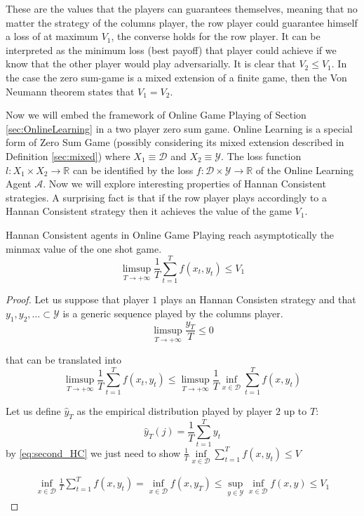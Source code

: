 These are the values that the players can guarantees themselves, meaning that no matter the strategy of the columns player, the row player could guarantee himself a loss of at maximum $V_1$, the converse holds for the row player. It can be interpreted as the minimum loss (best payoff) that player could achieve if we know that the other player would play adversarially. It is clear that $V_2\le V_1$. In the case the zero sum-game is a mixed extension of a finite game, then the Von Neumann theorem states that $V_1=V_2$.
 
Now we will embed the framework of Online Game Playing of Section \ref{sec:OnlineLearning} in a two player zero sum game. 
Online Learning is a special form of Zero Sum Game (possibly considering its mixed extension described in Definition \ref{sec:mixed}) where $X_1\equiv \mathcal D$ and $X_2\equiv \mathcal Y$. The loss function $l:X_1\times X_2\to\mathbb R$ can be identified by the loss $f:\mathcal D\times \mathcal Y\to\mathbb R$ of the Online Learning Agent $\mathcal A$.
Now we will explore interesting properties of Hannan Consistent strategies. A surprising fact is that if the row player plays accordingly to a Hannan Consistent strategy then it achieves the value of the game $V_1$. 

\begin{theorem}
    Hannan Consistent agents in Online Game Playing reach asymptotically the minmax value of the one shot game.
    $$\limsup\limits_{T\to +\infty}\frac{1}{T}\sum\limits_{t=1}^Tf(x_t,y_t)\le V_1$$
\end{theorem}

\begin{proof}
    Let us suppose that player $1$ plays an Hannan Consisten strategy and that $y_1,y_2,\ldots \subset \mathcal Y$ is a generic sequence played by the columns player.
    \begin{equation}
        \limsup\limits_{T\to+\infty}\frac{y_T}{T}\le0
    \end{equation}
    
    that can be translated into 
    \begin{equation}\label{eq:second_HC}
        \limsup\limits_{T\to+\infty}\frac{1}{T}\sum\limits_{t=1}^Tf(x_t,y_t)\le\limsup\limits_{T\to+\infty}\frac{1}{T}\inf\limits_{x\in\mathcal D}\sum\limits_{t=1}^Tf(x,y_t)
    \end{equation}

    Let us define $\hat y_T$ as the empirical distribution played by player $2$ up to $T$:
    $$\hat y_T(j)=\frac{1}{T}\sum\limits_{t=1}^Ty_t$$
    by \eqref{eq:second_HC} we just need to show $\frac{1}{T}\inf\limits_{x\in \mathcal D} \sum\limits_{t=1}^T f(x,y_t)\le V$

    \begin{align}
        \inf\limits_{x\in\mathcal D}\frac{1}{T}\sum\limits_{t=1}^T f(x,y_t)=\inf\limits_{x\in\mathcal D} f(x,y_T)\le\sup\limits_{y\in\mathcal Y}\inf\limits_{x\in\mathcal D} f(x,y)\le V_1
    \end{align}
\end{proof}

